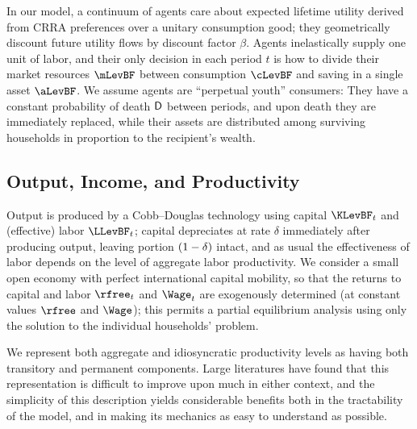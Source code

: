 In our model, a continuum of agents care about expected lifetime utility derived from CRRA preferences over a unitary consumption good; they geometrically discount future utility flows by discount factor $\beta$.  Agents inelastically supply one unit of labor, and their only decision in each period $t$ is how to divide their market resources $\mLevBF$ between consumption $\cLevBF$ and saving in a single asset $\aLevBF$.  We assume agents are \cite{blanchardFinite} ``perpetual youth'' consumers: They have a constant probability of death $\mathsf{D}$ between periods, and upon death they are immediately replaced, while their assets are distributed among surviving households in proportion to the recipient's wealth.

\subsection{Output, Income, and Productivity}

Output is produced by a Cobb--Douglas technology using capital $\KLevBF_t$ and (effective) labor $\LLevBF_t$; capital depreciates at rate $\delta$ immediately after producing output, leaving portion $(1-\delta)$ intact, and as usual the effectiveness of labor depends on the level of aggregate labor productivity.  We consider a small open economy with perfect international capital mobility, so that the returns to capital and labor $\rfree_t$ and $\Wage_t$ are exogenously determined (at constant values $\rfree$ and $\Wage$); this permits a partial equilibrium analysis using only the solution to the individual households' problem. %

We represent both aggregate and idiosyncratic productivity levels as having both transitory and permanent components.  Large literatures have found that this representation is difficult to improve upon much in either context, and the simplicity of this description yields considerable benefits both in the tractability of the model, and in making its mechanics as easy to understand as possible.

